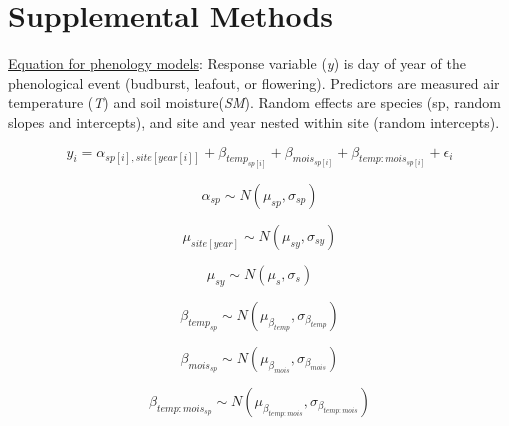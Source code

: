 \documentclass{article}
\begin{document}
\begin{singlespace}
\end{singlespace}


\clearpage

\section* {Supplemental Methods}
\underline{Equation for phenology models}: 
Response variable (\textit{y}) is day of year of the phenological event (budburst, leafout, or flowering). Predictors are measured air temperature (\textit{T}) and soil moisture(\textit{SM}). Random effects are species (sp, random slopes and intercepts), and  site and year nested within site (random intercepts).

\begin{equation}
y_{i}=\alpha_{sp[i],site[year[i]]} + \beta_{temp_{sp[i]}}+ \beta_{mois_{sp[i]}} + \beta_{temp:mois_{sp[i]}}+\epsilon_{i}\label{eq:8}
\end{equation}

\begin{equation}
\alpha_{sp}\sim N(\mu_{sp}, \sigma_{sp})
\end{equation}

\begin{equation}
\mu_{site[year]} \sim N(\mu_{sy}, \sigma_{sy})
\end{equation}

\begin{equation}
\mu_{sy} \sim N(\mu_{s}, \sigma_{s})
\end{equation}

\begin{equation}
\beta_{temp_{sp}} \sim N(\mu_{\beta_{temp}}, \sigma_{\beta_{temp}})
\end{equation}

\begin{equation}
\beta_{mois_{sp}} \sim N(\mu_{\beta_{mois}}, \sigma_{\beta_{mois}})
\end{equation}

\begin{equation}
\beta_{temp:mois_{sp}} \sim N(\mu_{\beta_{temp:mois}}, \sigma_{\beta_{temp:mois}})
\end{equation}
\end{document}
